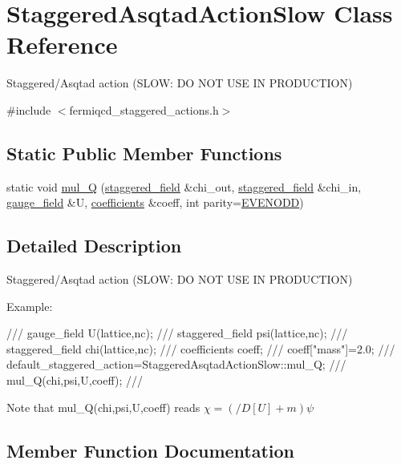 \hypertarget{class_staggered_asqtad_action_slow}{}\section{Staggered\+Asqtad\+Action\+Slow Class Reference}
\label{class_staggered_asqtad_action_slow}


Staggered/\+Asqtad action (S\+L\+OW\+: DO N\+OT U\+SE IN P\+R\+O\+D\+U\+C\+T\+I\+ON)  




{\ttfamily \#include $<$fermiqcd\+\_\+staggered\+\_\+actions.\+h$>$}

\subsection*{Static Public Member Functions}
\begin{DoxyCompactItemize}
\item 
static void \hyperlink{class_staggered_asqtad_action_slow_a4f8d884eea1ada9aa030bf885f633472}{mul\+\_\+Q} (\hyperlink{classstaggered__field}{staggered\+\_\+field} \&chi\+\_\+out, \hyperlink{classstaggered__field}{staggered\+\_\+field} \&chi\+\_\+in, \hyperlink{classgauge__field}{gauge\+\_\+field} \&U, \hyperlink{classcoefficients}{coefficients} \&coeff, int parity=\hyperlink{mdp__global__vars_8h_a4c9de81f2de5a74b588107b6c0afb9ee}{E\+V\+E\+N\+O\+DD})
\end{DoxyCompactItemize}


\subsection{Detailed Description}
Staggered/\+Asqtad action (S\+L\+OW\+: DO N\+OT U\+SE IN P\+R\+O\+D\+U\+C\+T\+I\+ON) 

Example\+: \begin{DoxyVerb}/// gauge_field U(lattice,nc);
/// staggered_field psi(lattice,nc);
/// staggered_field chi(lattice,nc);
/// coefficients coeff;
/// coeff["mass"]=2.0;
/// default_staggered_action=StaggeredAsqtadActionSlow::mul_Q;
/// mul_Q(chi,psi,U,coeff);
/// \end{DoxyVerb}
 Note that mul\+\_\+\+Q(chi,psi,\+U,coeff) reads $ \chi=(/\!\!\!D[U]+m)\psi $ 

\subsection{Member Function Documentation}
\mbox{\label{class_staggered_asqtad_action_slow_a4f8d884eea1ada9aa030bf885f633472}} 
